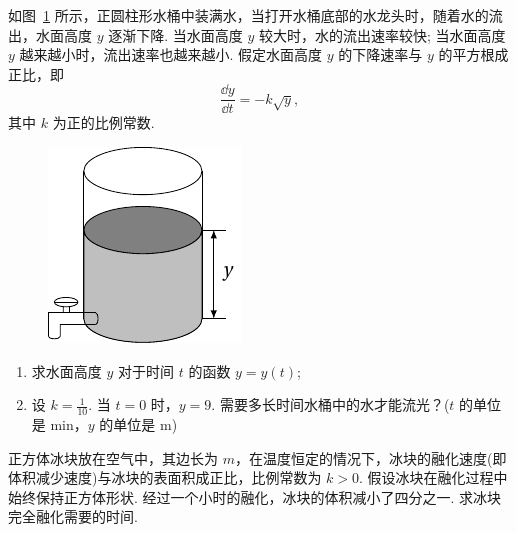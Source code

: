 	\begin{ti}
		如图~\ref{fig:1.8.1} 所示，正圆柱形水桶中装满水，当打开水桶底部的水龙头时，随着水的流出，水面高度 $y$ 逐渐下降. 当水面高度 $y$ 较大时，水的流出速率较快; 当水面高度 $y$ 越来越小时，流出速率也越来越小. 假定水面高度 $y$ 的下降速率与 $y$ 的平方根成正比，即
		\begin{equation}\label{eq:8.45}
			\frac{\dd{y}}{\dd{t}} = - k \sqrt{y},
		\end{equation}
		其中 $k$ 为正的比例常数.
		\begin{figure}[htbp]
			\centering
			\includegraphics[scale=1]{figure/fig1-8-1.pdf}
			\caption{}\label{fig:1.8.1}
		\end{figure}
		\begin{enumerate}
			\item 求水面高度 $y$ 对于时间 $t$ 的函数 $y = y(t)$;
			\item 设 $k = \frac{1}{10}$. 当 $t = 0$ 时，$y = 9$. 需要多长时间水桶中的水才能流光？($t$ 的单位是 \si{min}，$y$ 的单位是 \si{m})
		\end{enumerate}
	\end{ti}

	\begin{ti}
		正方体冰块放在空气中，其边长为 $m$，在温度恒定的情况下，冰块的融化速度(即体积减少速度)与冰块的表面积成正比，比例常数为 $k > 0$. 假设冰块在融化过程中始终保持正方体形状. 经过一个小时的融化，冰块的体积减小了四分之一. 求冰块完全融化需要的时间.
	\end{ti}